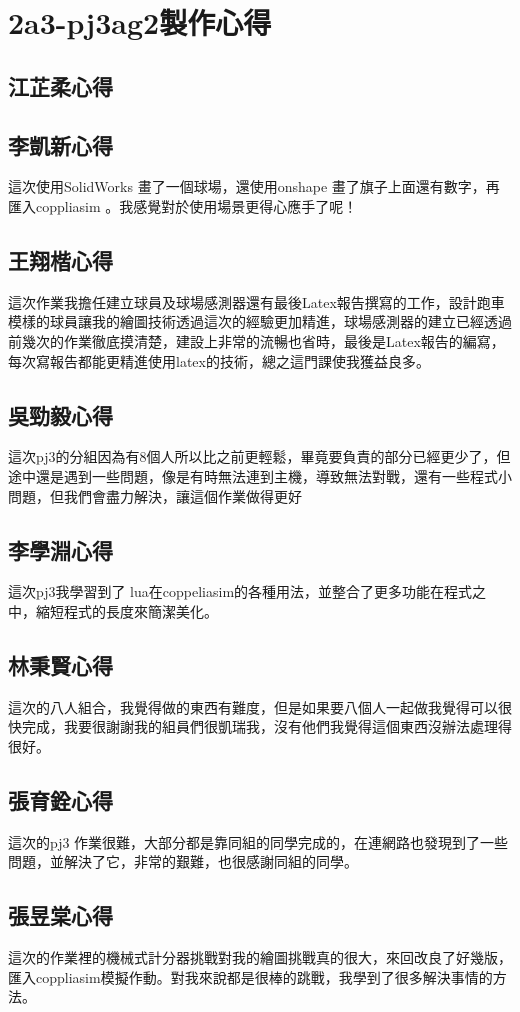 \chapter{2a3-pj3ag2製作心得}
\section{江芷柔心得}
\section{李凱新心得}
這次使用SolidWorks 畫了一個球場，還使用onshape 畫了旗子上面還有數字，再匯入coppliasim 。我感覺對於使用場景更得心應手了呢！
\section{王翔楷心得}
這次作業我擔任建立球員及球場感測器還有最後Latex報告撰寫的工作，設計跑車模樣的球員讓我的繪圖技術透過這次的經驗更加精進，球場感測器的建立已經透過前幾次的作業徹底摸清楚，建設上非常的流暢也省時，最後是Latex報告的編寫，每次寫報告都能更精進使用latex的技術，總之這門課使我獲益良多。
\section{吳勁毅心得}
這次pj3的分組因為有8個人所以比之前更輕鬆，畢竟要負責的部分已經更少了，但途中還是遇到一些問題，像是有時無法連到主機，導致無法對戰，還有一些程式小問題，但我們會盡力解決，讓這個作業做得更好
\section{李學淵心得}
這次pj3我學習到了 lua在coppeliasim的各種用法，並整合了更多功能在程式之中，縮短程式的長度來簡潔美化。
\section{林秉賢心得}
這次的八人組合，我覺得做的東西有難度，但是如果要八個人一起做我覺得可以很快完成，我要很謝謝我的組員們很凱瑞我，沒有他們我覺得這個東西沒辦法處理得很好。
\section{張育銓心得}
這次的pj3 作業很難，大部分都是靠同組的同學完成的，在連網路也發現到了一些問題，並解決了它，非常的艱難，也很感謝同組的同學。
\section{張昱棠心得}
這次的作業裡的機械式計分器挑戰對我的繪圖挑戰真的很大，來回改良了好幾版，匯入coppliasim模擬作動。對我來說都是很棒的跳戰，我學到了很多解決事情的方法。
\newpage